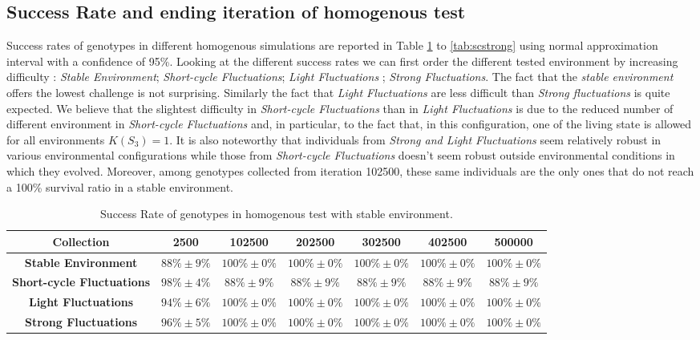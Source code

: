 \subsection{Success Rate and ending iteration of homogenous test}
Success rates of genotypes in different homogenous simulations are reported in Table \ref{tab:scstable} to \ref{tab:scstrong} using normal approximation interval with a confidence of 95\%. Looking at the different success rates we can first order the different tested environment by increasing difficulty : \emph{Stable Environment}; \emph{Short-cycle Fluctuations}; \emph{Light Fluctuations} ; \emph{Strong Fluctuations}. The fact that the \emph{stable environment} offers the lowest challenge is not surprising. Similarly the fact that \emph{Light Fluctuations} are less difficult than \emph{Strong fluctuations} is quite expected. We believe that the slightest difficulty in \emph{Short-cycle Fluctuations} than in \emph{Light Fluctuations} is due to the reduced number of different environment in \emph{Short-cycle Fluctuations} and, in particular, to the fact that, in this configuration, one of the living state is allowed for all environments $K(S_3)=1$. It is also noteworthy that individuals from \emph{Strong and Light Fluctuations} seem relatively robust in various environmental configurations while those from \emph{Short-cycle Fluctuations} doesn't seem robust outside environmental conditions in which they evolved. Moreover, among genotypes collected from iteration 102500, these same individuals are the only ones that do not reach a 100\% survival ratio in a stable environment.
 


\begin{table}
\caption{Success Rate of genotypes in homogenous test with stable environment.\label{tab:scstable}}
\scriptsize
\begin{tabular}{ccccccc}
\toprule%
{\textbf{Collection}} & {\textbf{2500}} & \textbf{102500} & \textbf{202500} &\textbf{302500} &\textbf{402500} &\textbf{500000} \tabularnewline
\toprule%
\textbf{Stable Environment} & $88\%\pm9\%$ & $100\%\pm0\%$ & $100\%\pm0\%$ & $100\%\pm0\%$ & $100\%\pm0\%$ & $100\%\pm0\%$\tabularnewline

\textbf{Short-cycle Fluctuations} & $98\%\pm4\%$ & $88\%\pm9\%$ & $88\%\pm9\%$ & $88\%\pm9\%$ & $88\%\pm9\%$ & $88\%\pm9\%$\tabularnewline

\textbf{Light Fluctuations} & $94\%\pm6\%$ & $100\%\pm0\%$ & $100\%\pm0\%$ & $100\%\pm0\%$ & $100\%\pm0\%$ & $100\%\pm0\%$\tabularnewline

\textbf{Strong Fluctuations} & $96\%\pm5\%$ & $100\%\pm0\%$ & $100\%\pm0\%$ & $100\%\pm0\%$ & $100\%\pm0\%$ & $100\%\pm0\%$\tabularnewline

\bottomrule%
\end{tabular}%
\end{table} 

